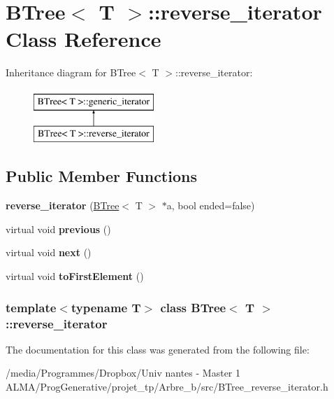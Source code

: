 \hypertarget{classBTree_1_1reverse__iterator}{
\section{BTree$<$ T $>$::reverse\_\-iterator Class Reference}
\label{classBTree_1_1reverse__iterator}
}
Inheritance diagram for BTree$<$ T $>$::reverse\_\-iterator:\begin{figure}[H]
\begin{center}
\leavevmode
\includegraphics[height=2.000000cm]{classBTree_1_1reverse__iterator}
\end{center}
\end{figure}
\subsection*{Public Member Functions}
\begin{DoxyCompactItemize}
\item 
\hypertarget{classBTree_1_1reverse__iterator_a6fa59c7abfb1da84d37681c33e5d1794}{
{\bfseries reverse\_\-iterator} (\hyperlink{classBTree}{BTree}$<$ T $>$ $\ast$a, bool ended=false)}
\label{classBTree_1_1reverse__iterator_a6fa59c7abfb1da84d37681c33e5d1794}

\item 
\hypertarget{classBTree_1_1reverse__iterator_aba79def66924c5b31fb71f86a450368f}{
virtual void {\bfseries previous} ()}
\label{classBTree_1_1reverse__iterator_aba79def66924c5b31fb71f86a450368f}

\item 
\hypertarget{classBTree_1_1reverse__iterator_ae624f8b196dd4b6af8e8cb1b2911671b}{
virtual void {\bfseries next} ()}
\label{classBTree_1_1reverse__iterator_ae624f8b196dd4b6af8e8cb1b2911671b}

\item 
\hypertarget{classBTree_1_1reverse__iterator_a413004d00bf9f246407c267c907cb896}{
virtual void {\bfseries toFirstElement} ()}
\label{classBTree_1_1reverse__iterator_a413004d00bf9f246407c267c907cb896}

\end{DoxyCompactItemize}
\subsubsection*{template$<$typename T$>$ class BTree$<$ T $>$::reverse\_\-iterator}



The documentation for this class was generated from the following file:\begin{DoxyCompactItemize}
\item 
/media/Programmes/Dropbox/Univ nantes -\/ Master 1 ALMA/ProgGenerative/projet\_\-tp/Arbre\_\-b/src/BTree\_\-reverse\_\-iterator.h\end{DoxyCompactItemize}
